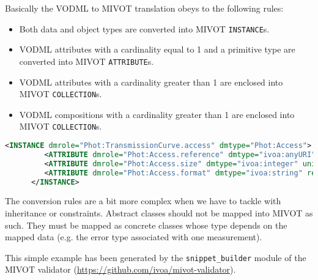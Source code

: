 Basically the VODML to MIVOT translation obeys to the following rules:
\begin{itemize}
    \item Both data and object types are converted into MIVOT \texttt{INSTANCE}s. 
    \item VODML attributes with a cardinality equal to 1 and a primitive type 
          are converted into MIVOT \texttt{ATTRIBUTE}s. 
    \item VODML attributes with a cardinality greater than 1 are enclosed into MIVOT \texttt{COLLECTION}s. 
    \item VODML compositions with a cardinality greater than 1 are enclosed into MIVOT \texttt{COLLECTION}s.     
\end{itemize} 

\begin{lstlisting}[caption={MIVOT instanciation of the PhotDM class \texttt{Access}. 
VODML attributes are mapped as simple \texttt{ATTRIBUTE}s since their cardinality is equal to 
1 and they have primitive types. In this example, automatically 
generated, \texttt{ATTRIBUTE}s come with both \texttt{@ref} and \texttt{@value}. Using one, the other or both 
depends on the actual data being annotated (see \ref{ATTRIBUTE}). 
The cryptic  "@@@@@" labels are due to a trick of the annoter tool. They must be replaced with the 
 actual \texttt{FIELD} names for attributes that are set from field values.
},language=XML]
      <INSTANCE dmrole="Phot:TransmissionCurve.access" dmtype="Phot:Access">
         <ATTRIBUTE dmrole="Phot:Access.reference" dmtype="ivoa:anyURI" ref="@@@@@" value=""/>
         <ATTRIBUTE dmrole="Phot:Access.size" dmtype="ivoa:integer" unit="" ref="@@@@@" value=""/>
         <ATTRIBUTE dmrole="Phot:Access.format" dmtype="ivoa:string" ref="@@@@@" value=""/>
      </INSTANCE>
\end{lstlisting}  

The conversion rules are a bit more complex when we have to tackle with inheritance or constraints.
Abstract classes should not be mapped into MIVOT as such. They must be mapped as concrete classes 
whose type depends on the mapped data (e.g. the error type associated with one measurement).

This simple example has been generated by the \texttt{snippet\_builder} module of the MIVOT validator 
(\url{https://github.com/ivoa/mivot-validator}).

